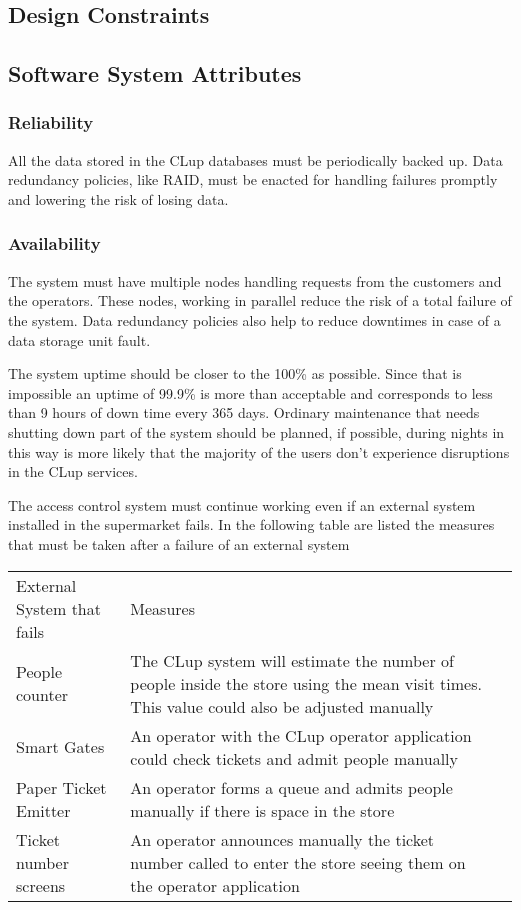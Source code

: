 \subsection{Design Constraints}
\subsection{Software System Attributes}
\subsubsection{Reliability}
    All the data stored in the CLup databases must be periodically backed up. Data redundancy policies, like RAID, must be enacted for handling failures promptly and lowering the risk of losing data.

\subsubsection{Availability}
    The system must have multiple nodes handling requests from the customers and the operators. These nodes, working in parallel reduce the risk of a total failure of the system. Data redundancy policies also help to reduce downtimes in case of a data storage unit fault.

    \smallskip 

    The system uptime should be closer to the 100\% as possible. Since that is impossible an uptime of 99.9\% is more than acceptable and corresponds to less than 9 hours of down time every 365 days.
    Ordinary maintenance that needs shutting down part of the system should be planned, if possible, during nights in this way is more likely that the majority of the users don't experience disruptions in the CLup services. 

    \smallskip

    The access control system must continue working even if an external system installed in the supermarket fails. In the following table are listed the measures that must be taken after a failure of an external system
    \smallskip
    
    \begin{tabular}{C{5cm}L{10.0cm}C{2.0cm}}
        External System that fails & Measures       \\
        People counter & The CLup system will estimate the number of people inside the store using the mean visit times. This value could also be adjusted manually \\
        Smart Gates & An operator with the CLup operator application could check tickets and admit people manually \\
        Paper Ticket Emitter & An operator forms a queue and admits people manually if there is space in the store\\
        Ticket number screens & An operator announces manually the ticket number called to enter the store seeing them on the operator application\\
    \end{tabular}
